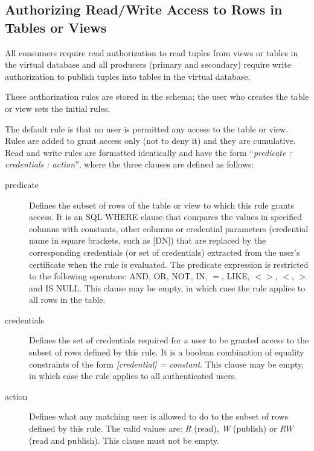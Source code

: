 \subsection{Authorizing Read/Write Access to Rows in Tables or Views}

All consumers require read authorization to read tuples from views or
tables in the virtual database and all producers (primary and
secondary) require write authorization to publish tuples into tables
in the virtual database.

These authorization rules are stored in the schema; the user who
creates the table or view sets the initial rules.

The default rule is that no user is permitted any access to the table
or view.  Rules are added to grant access only (not to deny it) and
they are cumulative.  Read and write rules are formatted identically
and have the form ``\textit{predicate : credentials : action}'', where
the three clauses are defined as follows:

\begin{description}

\item[predicate] Defines the subset of rows of the table or view to
  which this rule grants access. It is an SQL WHERE clause that
  compares the values in specified columns with constants, other
  columns or credential parameters (credential name in square
  brackets, such as [DN]) that are replaced by the corresponding
  credentials (or set of credentials) extracted from the user's
  certificate when the rule is evaluated. The predicate expression is
  restricted to the following operators: AND, OR, NOT, IN, \(=\),
  LIKE, \(<>\), \(<\), \(>\) and IS NULL. This clause may be empty, in
  which case the rule applies to all rows in the table.

\item[credentials] Defines the set of credentials required for a user
  to be granted access to the subset of rows defined by this rule. It
  is a boolean combination of equality constraints of the form
  \textit{[credential] = constant}. This clause may be empty, in which
  case the rule applies to all authenticated users.

\item[action] Defines what any matching user is allowed to do to the
  subset of rows defined by this rule. The valid values are:
  \textit{R} (read), \textit{W} (publish) or \textit{RW} (read and
  publish). This clause must not be empty.

\end{description}

